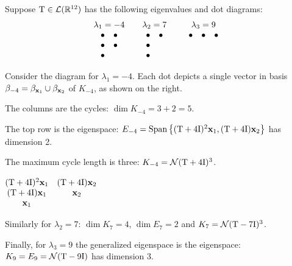 \begin{example}{}{}
	Suppose $\mathrm{T}\in\mathcal{L}(\mathbb{R}^{12})$ has the following eigenvalues and dot diagrams:
  \[
	  \begin{array}{c@{\qquad}c@{\qquad}c}
	  	\lambda_1=-4&\lambda_2=7&\lambda_3=9\\
	  	\begin{array}{cc}
	  		\bullet&\bullet\\
	  		\bullet&\bullet\\
	  		\bullet
	  	\end{array}
	  	&
	  	\begin{array}{cc}
	  		\bullet&\bullet\\
	  		\bullet\\
	 			\bullet
	 		\end{array}
	 		&
	  	\begin{array}{ccc}
	  		\bullet&\bullet&\bullet\\
	  		&&\\
	  		&&
	  	\end{array}
	  \end{array}
	\]
	\begin{minipage}[t]{0.74\linewidth}\vspace{0pt}
  	Consider the diagram for $\lambda_1=-4$. Each dot depicts a single vector in basis $\beta_{-4}=\beta_{{\mathbf{x}}_1}\cup\beta_{{\mathbf{x}}_2}$ of $K_{-4}$, as shown on the right.
  	\begin{enumeratea}\itemsep0pt
  	  \item The columns are the cycles: $\dim K_{-4}=3+2=5$.
  	  \item The top row is the eigenspace: $E_{-4}=\operatorname{Span}\big\{(\mathrm{T}+4\mathrm{I})^2{\mathbf{x}}_1,(\mathrm{T}+4\mathrm{I}){\mathbf{x}}_2\big\}$ has dimension 2. 
  	  \item The maximum cycle length is three: $K_{-4}=\mathcal{N}(\mathrm{T}+4\mathrm{I})^3$.
  	\end{enumeratea}
	\end{minipage}
	\hfill
	\begin{minipage}[t]{0.25\linewidth}\vspace{0pt}
	  \hfill$\begin{array}[t]{@{}cc@{}}
			(\rT+4\I)^2\vx_1&(\rT+4\I)\vx_2\\
			(\rT+4\I)\vx_1&\vx_2\\
			\vx_1
		\end{array}$
	\end{minipage}\bigbreak
	Similarly for $\lambda_2=7$: $\dim K_7=4$, $\dim E_7=2$ and $K_7=\mathcal{N}(\mathrm{T}-7\mathrm{I})^3$.\par
	Finally, for $\lambda_3=9$ the generalized eigenspace is the eigenspace: $K_9=E_9=\mathcal{N}(\mathrm{T}-9\mathrm{I})$ has dimension 3.\smallbreak

\end{example}
